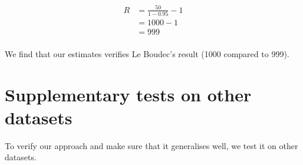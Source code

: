 \documentclass{article}
\begin{document}
\begin{align*}
    R & = \frac{50}{1 - 0.95} - 1 \\
      & = 1000 - 1                \\
      & = 999                     \\
\end{align*}

We find that our estimates verifies Le Boudec's result (1000 compared to 999).

\newpage
\appendix
\section{Supplementary tests on other datasets}

To verify our approach and make sure that it generalises well, we test it on other datasets.
\end{document}
